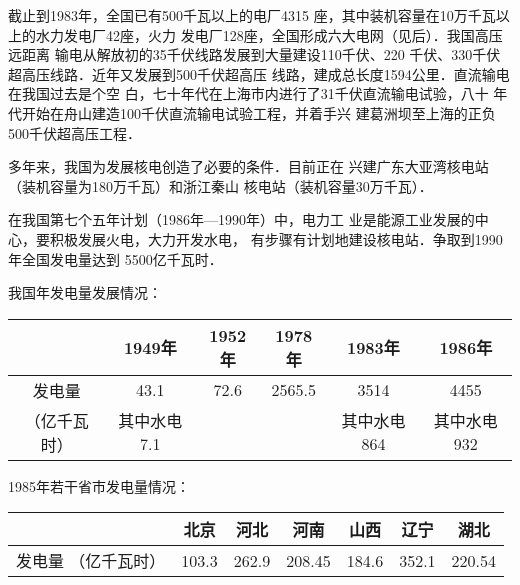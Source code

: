 截止到1983年，全国已有500千瓦以上的电厂4315
座，其中装机容量在10万千瓦以上的水力发电厂42座，火力
发电厂128座，全国形成六大电网（见后）．我国高压远距离
输电从解放初的35千伏线路发展到大量建设110千伏、220
千伏、330千伏超高压线路．近年又发展到500千伏超高压
线路，建成总长度1594公里．直流输电在我国过去是个空
白，七十年代在上海市内进行了31千伏直流输电试验，八十
年代开始在舟山建造100千伏直流输电试验工程，并着手兴
建葛洲坝至上海的正负500千伏超高压工程．

多年来，我国为发展核电创造了必要的条件．目前正在
兴建广东大亚湾核电站（装机容量为180万千瓦）和浙江秦山
核电站（装机容量30万千瓦）．

在我国第七个五年计划（1986年—1990年）中，电力工
业是能源工业发展的中心，要积极发展火电，大力开发水电，
有步骤有计划地建设核电站．争取到1990年全国发电量达到
5500亿千瓦时．

我国年发电量发展情况：
\begin{center}
\begin{tabular}{c|ccccc}
    \hline
   & 1949年&    1952年&    1978年&    1983年&    1986年\\
   \hline
   发电量  &43.1&   72.6 &  2565.5  & 3514   &    4455\\
   （亿千瓦时）&  其中水电7.1 &    &    &   其中水电864 &    其中水电932\\
   \hline
\end{tabular}
\end{center}

1985年若干省市发电量情况：
\begin{center}
\begin{tabular}{c|cccccc}
    \hline
   & 北京&   河北&   河南&   山西&   辽宁&   湖北\\
   \hline
   发电量 （亿千瓦时） &103.3&   262.9&   208.45&   184.6&   352.1&   220.54\\
   \hline
\end{tabular}
\end{center}

